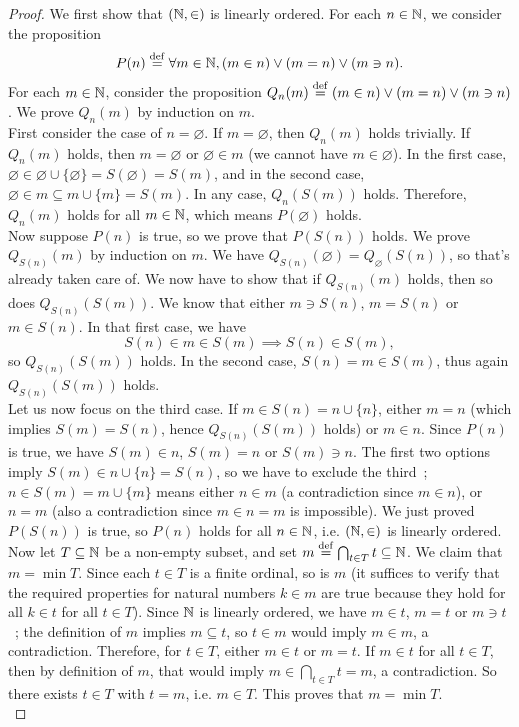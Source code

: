 \begin{proof}
    We first show that $(\operatorname{\mathbb N},\in)$ is linearly ordered. For each $n \in \operatorname{\mathbb N}$, we consider the proposition 
    \[
        P(n) \overset{\mathrm{def}}{=} \forall m \in \operatorname{\mathbb N}, (m \in n) \vee (m = n) \vee (m \ni n). 
    \]
    For each $m \in \operatorname{\mathbb N}$, consider the proposition $Q_n(m) \overset{\mathrm{def}}{=} (m \in n) \vee (m = n) \vee (m \ni n)$. We prove $Q_n(m)$ by induction on $m$. 
    \\

    First consider the case of $n = \varnothing$. If $m = \varnothing$, then $Q_n(m)$ holds trivially. If $Q_n(m)$ holds, then $m = \varnothing$ or $\varnothing \in m$ (we cannot have $m \in \varnothing$). In the first case, $\varnothing \in \varnothing \cup \{\varnothing\} = S(\varnothing) = S(m)$, and in the second case, $\varnothing \in m \subseteq m \cup \{m\} = S(m)$. In any case, $Q_n(S(m))$ holds. Therefore, $Q_n(m)$ holds for all $m \in \operatorname{\mathbb N}$, which means $P(\varnothing)$ holds.
    \\

    Now suppose $P(n)$ is true, so we prove that $P(S(n))$ holds. We prove $Q_{S(n)}(m)$ by induction on $m$. We have $Q_{S(n)}(\varnothing) = Q_{\varnothing}(S(n))$, so that's already taken care of. We now have to show that if $Q_{S(n)}(m)$ holds, then so does $Q_{S(n)}(S(m))$. We know that either $m \ni S(n)$, $m = S(n)$ or $m \in S(n)$. In that first case, we have
    \[
        S(n) \in m \in S(m) \implies S(n) \in S(m),
    \]
    so $Q_{S(n)}(S(m))$ holds. In the second case, $S(n) = m \in S(m)$, thus again $Q_{S(n)}(S(m))$ holds. 
    \\
    
    Let us now focus on the third case. If $m \in S(n) = n \cup \{n\}$, either $m = n$ (which implies $S(m) = S(n)$, hence $Q_{S(n)}(S(m))$ holds) or $m \in n$. Since $P(n)$ is true, we have $S(m) \in n$, $S(m) = n$ or $S(m) \ni n$. The first two options imply $S(m) \in n \cup \{n\} = S(n)$, so we have to exclude the third~; $n \in S(m) = m \cup \{m\}$ means either $n \in m$ (a contradiction since $m \in n$), or $n = m$ (also a contradiction since $m \in n = m$ is impossible). We just proved $P(S(n))$ is true, so $P(n)$ holds for all $n \in \operatorname{\mathbb N}$, i.e. $(\operatorname{\mathbb N},\in)$ is linearly ordered. 
    \\
    
    Now let $T \subseteq \operatorname{\mathbb N}$ be a non-empty subset, and set $m \overset{\mathrm{def}}{=} \bigcap_{t \in T} t \subseteq \operatorname{\mathbb N}$. We claim that $m = \min T$. Since each $t \in T$ is a finite ordinal, so is $m$ (it suffices to verify that the required properties for natural numbers $k \in m$ are true because they hold for all $k \in t$ for all $t \in T$). Since $\operatorname{\mathbb N}$ is linearly ordered, we have $m \in t$, $m=t$ or $m \ni t$~; the definition of $m$ implies $m \subseteq t$, so $t \in m$ would imply $m \in m$, a contradiction. Therefore, for $t \in T$, either $m \in t$ or $m = t$. If $m \in t$ for all $t \in T$, then by definition of $m$, that would imply $m \in \bigcap_{t \in T} t = m$, a contradiction. So there exists $t \in T$ with $t = m$, i.e. $m \in T$. This proves that $m = \min T$.  
    \\


\end{proof}
